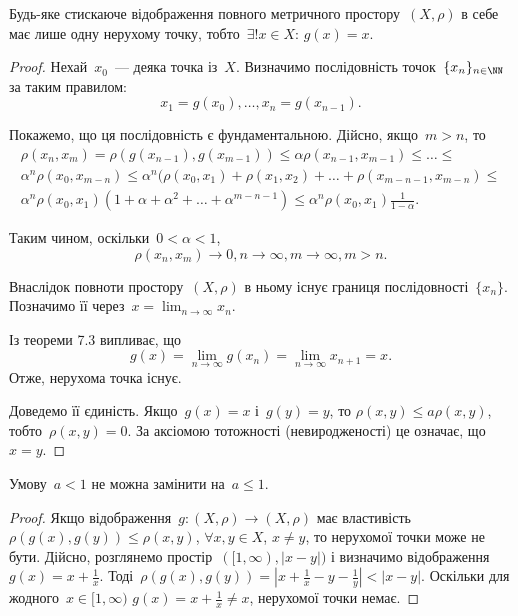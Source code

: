 \begin{theorem}
Будь-яке стискаюче відображення повного
метричного простору~$(X, \rho)$ в себе має лише одну
нерухому точку, тобто~$\exists! x \in X$: $g(x) = x$.
\end{theorem}

\begin{proof}
Нехай~$x_0$~--- деяка точка із~$X$. Визначимо
послідовність точок~$\{x_n\}_{n \in \NN}$ за таким правилом:
\begin{equation*}
    x_1 = g(x_0), \dots, x_n = g(x_{n - 1}).
\end{equation*}

Покажемо, що ця послідовність є фундаментальною.
Дійсно, якщо~$m > n$, то
\begin{multline*}
    \rho(x_n, x_m) = \rho(g(x_{n - 1}), g(x_{m - 1})) \le
    \alpha \rho(x_{n - 1}, x_{m - 1}) \le \dots \le \\
    \alpha^n \rho(x_0, x_{m - n}) \le
    \alpha^n ( \rho(x_0, x_1) + \rho(x_1, x_2) + \dots + \rho(x_{m - n - 1}, x_{m - n}) \le \\
    \alpha^n \rho(x_0, x_1) (1 + \alpha + \alpha^2 + \dots + \alpha^{m - n - 1}) \le
    \alpha^n \rho(x_0, x_1) \tfrac{1}{1 - \alpha}.
\end{multline*}

Таким чином, оскільки~$0 < \alpha < 1$,
\begin{equation*}
    \rho(x_n, x_m) \to 0, n \to \infty, m \to \infty, m > n.
\end{equation*}

Внаслідок повноти простору~$(X, \rho)$ в ньому існує границя
послідовності~$\{x_n\}$. Позначимо її через~$x = \lim_{n \to \infty} x_n$.

Із теореми 7.3 випливає, що
\begin{equation*}
    g(x) = \lim_{n \to \infty} g(x_n) = \lim_{n \to \infty} x_{n + 1} = x.
\end{equation*}
Отже, нерухома точка існує.

Доведемо її єдиність. Якщо~$g(x) = x$ і~$g(y) = y$, то
$\rho(x, y) \le a \rho(x, y)$, тобто~$\rho(x, y) = 0$.
За аксіомою тотожності (невиродженості) це означає, що~$x = y$. 
\end{proof}

\begin{corollary}
Умову~$a < 1$ не можна замінити на~$a \le 1$.
\end{corollary}

\begin{proof}
Якщо відображення~$g: (X, \rho) \to (X, \rho)$
має властивість~$\rho(g(x), g(y)) \le \rho(x, y)$,
$\forall x, y \in X$, $x \ne y$,
то нерухомої точки може не бути.
Дійсно, розглянемо простір~$([1, \infty), |x - y|)$
і визначимо відображення~$g(x) = x + \frac{1}{x}$.
Тоді~$\rho(g(x), g(y)) = |x + \frac{1}{x} - y - \frac{1}{y}| < |x - y|$. 
Оскільки для жодного~$x \in [1, \infty)$
$g(x) = x + \frac{1}{x} \ne x$,
нерухомої точки немає.
\end{proof}

